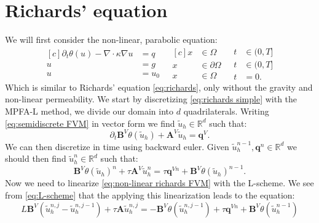 \documentclass[../Main/main.tex]{subfiles}
\begin{document}
	\section*{Richards' equation}
	We will first consider the non-linear, parabolic equation:
	\begin{equation}\label{eq:richards simple}
		\begin{aligned}[c]
			\partial_t \theta(u) - \nabla \cdot \kappa \nabla u &= q \\
			u &= g \\
			u &= u_0
		\end{aligned}
		\ \ \
		\begin{aligned}[c]
			x &\in \Omega  \\
			x &\in \partial \Omega \\
			x &\in \Omega  
		\end{aligned}
		\ \ \
		\begin{aligned}
			t&\in (0,T] \\
			t&\in (0,T] \\
			t&=0.
		\end{aligned}
	\end{equation}
	Which is similar to Richards' equation \eqref{eq:richards}, only without the gravity and non-linear permeability. We start by discretizing \eqref{eq:richards simple} with the MPFA-L method, we divide our domain into $d$ quadrilaterals. Writing \eqref{eq:semidiscrete FVM} in vector form we find $\tilde{u}_h \in \mathbb{R}^d$ such that:
	\begin{equation}
		\partial_t\pmb{B}^{V} \theta(\tilde{u}_h) + \pmb{A}^V \tilde{u}_h = \pmb{q}^V. 
	\end{equation}
	We can then discretize in time using backward euler. Given $ \tilde{u}_h^{n-1},\pmb{q}^n \in \mathbb{R}^d$ we should then find $ \tilde{u}_h^n \in \mathbb{R}^d$ such that: 
	\begin{equation} \label{eq:non-linear richards FVM}
		\pmb{B}^V  \theta(\tilde{u}_h)^n + \tau \pmb{A}^V \tilde{u}_h^n = \tau \pmb{q}^{Vn} + \pmb{B}^V  \theta(\tilde{u}_h)^{n-1}.
	\end{equation}
	Now we need to linearize \eqref{eq:non-linear richards FVM} with the L-scheme. We see from \eqref{eq:L-scheme} that the applying this linearization leads to the equation:
	\begin{equation}\label{eq:linearized richards fvm}
		L\pmb{B}^V(\tilde{u}^{n,j}_h-\tilde{u}^{n,j-1}_h) + \tau \pmb{A} \tilde{u}_h^{n,j} = -\pmb{B}^V \theta (\tilde{u}_h^{n,j-1})  + \tau \pmb{q}^{Vn} +  \pmb{B}^V \theta (\tilde{u}_h^{n-1})
	\end{equation}
\end{document}
